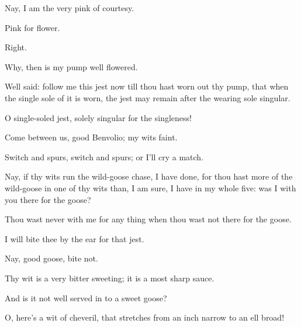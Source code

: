 \begin{speech}
Nay, I am the very pink of courtesy.
\end{speech}
\begin{speech}
Pink for flower.
\end{speech}
\begin{speech}
Right.
\end{speech}
\begin{speech}
Why, then is my pump well flowered.
\end{speech}
\begin{speech}
Well said: follow me this jest now
 till thou hast worn out thy pump, that when
 the single sole of it is worn, the jest may
 remain after the wearing sole singular.
\end{speech}
\begin{speech}
O single-soled jest, solely singular
for the singleness!
\end{speech}
\begin{speech}
Come between us, good Benvolio;
my wits faint.
\end{speech}
\begin{speech}
Switch and spurs, switch and spurs;
or I'll cry a match.
\end{speech}
\begin{speech}
Nay, if thy wits run the wild-goose
chase, I have done, for thou hast more of the
wild-goose in one of thy wits than, I am sure,
I have in my whole five: was I with you there
for the goose?
\end{speech}
\begin{speech}
Thou wast never with me for any
thing when thou wast not there for the goose.
\end{speech}
\begin{speech}
I will bite thee by the ear for that
jest.
\end{speech}
\begin{speech}
Nay, good goose, bite not.
\end{speech}
\begin{speech}
Thy wit is a very bitter sweeting;
it is a most sharp sauce.
\end{speech}
\begin{speech}
And is it not well served in to a
sweet goose?
\end{speech}
\begin{speech}
O, here's a wit of cheveril, that
stretches from an inch narrow to an ell broad!
\end{speech}
